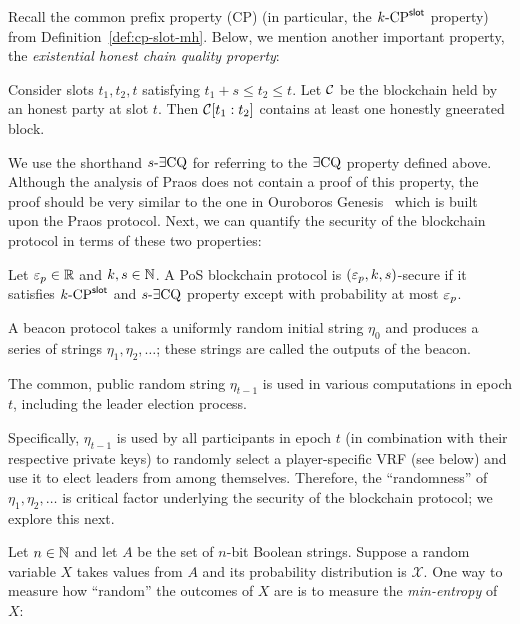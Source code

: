     Recall the common prefix property (CP) (in particular, the ${k}\text{-}\mathrm{CP}^{\mathsf{slot}}$ property) 
    from Definition~\ref{def:cp-slot-mh}. 
    Below, we mention another important property, 
    the \emph{existential honest chain quality property}: 


    \begin{definition}\label{def:ECQ}        
        Consider slots $t_1, t_2, t$ satisfying $t_1 + s \leq t_2 \leq t$. 
        Let $\mathcal{C}$ be the blockchain held by an honest party at slot $t$. 
        Then $\mathcal{C}[t_1:t_2]$ contains at least one 
        honestly gneerated block.
    \end{definition}
    We use the shorthand ${s}\text{-}\exists\mathrm{CQ}$ for referring to the $\exists\mathrm{CQ}$ property defined above. 
    Although the analysis of Praos does not contain a proof of this property, 
    the proof should be very similar to the one in Ouroboros Genesis~\cite{Genesis} 
    which is built upon the Praos protocol.
    Next, we can quantify the security of the blockchain protocol in terms of these two properties:

    \begin{definition}\label{def:blockchain-security}
        Let $\mathsf{\varepsilon}_p \in \mathbb{R}$ and $k, s \in \mathbb{N}$. 
        A PoS blockchain protocol is $(\mathsf{\varepsilon}_p, k, s)$-secure if 
        it satisfies ${k}\text{-}\mathrm{CP}^{\mathsf{slot}}$ and ${s}\text{-}\exists\mathrm{CQ}$ property 
        except with probability at most $\mathsf{\varepsilon}_p$.
    \end{definition}






A beacon protocol takes a uniformly random initial string $\eta_0$ 
and produces a series of strings $\eta_1, \eta_2, \ldots$; 
these strings are called the outputs of the beacon.


The common, public random string $\eta_{t-1}$ 
is used in various computations in epoch $t$, 
including the leader election process.

Specifically, $\eta_{t-1}$ is used by all participants in epoch $t$ 
(in combination with their respective private keys) 
to randomly select a player-specific VRF (see below) 
and use it to elect leaders from among themselves.
Therefore, the ``randomness''
of $\eta_1, \eta_2, \ldots$ is critical factor underlying 
the security of the blockchain protocol; 
we explore this next.

Let $n \in \mathbb{N}$ and let $A$ be the set of $n$-bit Boolean strings.
Suppose a random variable $X$ takes values from $A$
and its probability distribution is $\mathcal{X}$. 
One way to measure how ``random'' the outcomes of $X$ are 
is to measure the \emph{min-entropy} of $X$:

